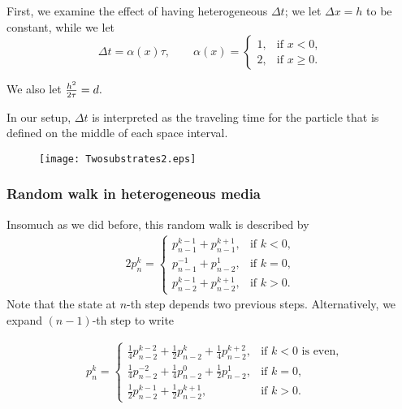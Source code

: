 \documentclass{beamer}
\def\blue{\color{blue}}
\begin{document}
  \begin{frame}

  First, we examine the effect of having heterogeneous $\Delta t$; we let $\Delta x = h$ to be constant, while we let
 \begin{equation*}\label{alpha}
\Delta t=\alpha(x)\tau,\qquad
\alpha(x) =
\left\{\begin{array}{ll}
        1, & \text{if } x<0,\\
        2, & \text{if } x\ge0.
        \end{array}\right.
\end{equation*}

\vspace{-1em}
We also let ${h^2\over 2\tau}=d.$

In our setup, $\Delta t$ is interpreted as the {\blue traveling time} for the particle that is defined on the middle of each space {\blue interval}.
 \begin{figure}
  \centering
  \texttt{[image: Twosubstrates2.eps]}
 \end{figure}
\end{frame} 
 \begin{frame}
 \frametitle{Random walk in heterogeneous media}
 Insomuch as we did before, this random walk is described by
 \begin{equation} \label{RW1}\tag{RW1}
\begin{aligned}
    2p^k_n = \left\{\begin{array}{lr}
        p^{k-1} _{n-1} + p ^{k+1} _{n-1}, & \text{if } k<0,\\
        p^{-1} _{n-1} + p ^{1} _{n-2}, & \text{if } k=0,\\
        p^{k-1} _{n-2} + p ^{k+1} _{n-2}, & \text{if } k>0.
        \end{array}\right.
\end{aligned}
\end{equation} 
Note that the state at $n$-th step depends two previous steps. \pause Alternatively, we expand $(n-1)$-th step to write

\begin{equation} \label{RW2}\tag{RW2}
\begin{aligned}
    &p^{k}_n = \left\{\begin{array}{ll}
        \frac{1}{4}p^{k-2} _{n-2} + \frac{1}{2}p ^{k} _{n-2} + \frac{1}{4} p^{k+2}_{n-2}, & \text{if $k<0$ is even},\\
        \frac{1}{4}p^{-2} _{n-2} + \frac{1}{4}p^{0} _{n-2} + \frac{1}{2}p ^{1} _{n-2}, & \text{if $k=0$},\\
        \frac{1}{2}p^{k-1} _{n-2} + \frac{1}{2}p ^{k+1} _{n-2}, & \text{if } k>0.
        \end{array}\right. 
\end{aligned}
\end{equation}
 \end{frame}  
\end{document}

